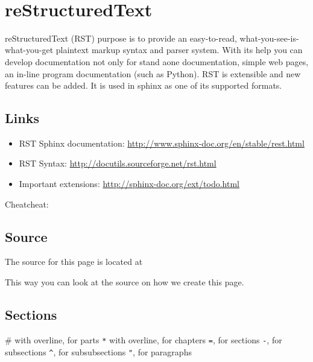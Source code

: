 \FILENAME\

\section{reStructuredText}\label{restructuredtext}

reStructuredText (RST) purpose is to provide an easy-to-read,
what-you-see-is-what-you-get plaintext markup syntax and parser system.
With its help you can develop documentation not only for stand aone
documentation, simple web pages, an in-line program documentation (such
as Python). RST is extensible and new features can be added. It is used
in sphinx as one of its supported formats.

\subsection{Links}\label{links}

\begin{itemize}

\item
  RST Sphinx documentation:
  \url{http://www.sphinx-doc.org/en/stable/rest.html}
\item
  RST Syntax: \url{http://docutils.sourceforge.net/rst.html}
\item
  Important extensions: \url{http://sphinx-doc.org/ext/todo.html}
\end{itemize}

Cheatcheat:
\smallskip


\subsection{Source}\label{source}

The source for this page is located at


This way you can look at the source on how we create this page.

\subsection{Sections}\label{sections}

\# with overline, for parts \verb|*| with overline, for chapters \verb|=|, for
sections \verb|-|, for subsections \verb|^|, for subsubsections \verb|"|, for paragraphs

